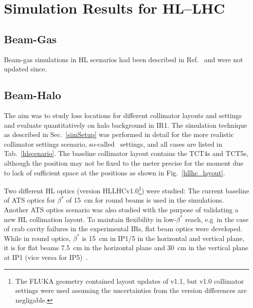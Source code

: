 \section{Simulation Results for HL--LHC\label{hllhcResults}}


\subsection{Beam-Gas}

Beam-gas simulations in HL scenarios had been described in Ref.~\cite{ipac2014_rkh} and were not updated since.

\subsection{Beam-Halo}
The aim was to study loss locations for different collimator layouts and settings and evaluate quantitatively on halo background in IR1. The simulation technique as described in Sec.~\ref{simSetup} was performed in detail for the more realistic collimator settings scenario, so-called \twosigmaret~settings, and all cases are listed in Tab.~\ref{hlscenario}. The baseline collimator layout contains the TCT4s and TCT5s, although the position may not be fixed to the meter precise for the moment due to lack of sufficient space at the positions as shown in Fig.~\ref{hllhc_layout}. 

Two different HL optics (version HLLHCv1.0\footnote{The FLUKA geometry contained layout updates of v1.1, but v1.0 collimator settings were used assuming the uncertainties from the version differences are negligable.}) were studied:
The current baseline of ATS optics for $\beta^{*}$ of 15~cm for round beams is used in the simulations.
Another ATS optics scenario was also studied with the purpose of validating a new HL collimation layout. To maintain flexibility in low-$\beta^*$ reach, e.g~in the case of crab cavity failures in the experimental IRs, flat beam optics were developed. While in round optics, $\beta^*$ is 15~cm in IP1/5 in the horizontal and vertical plane, it is for flat beams 7.5~cm in the horizontal plane and 30~cm in the vertical plane at IP1 (vice versa for IP5)~\cite{opticsWebRef}. 


